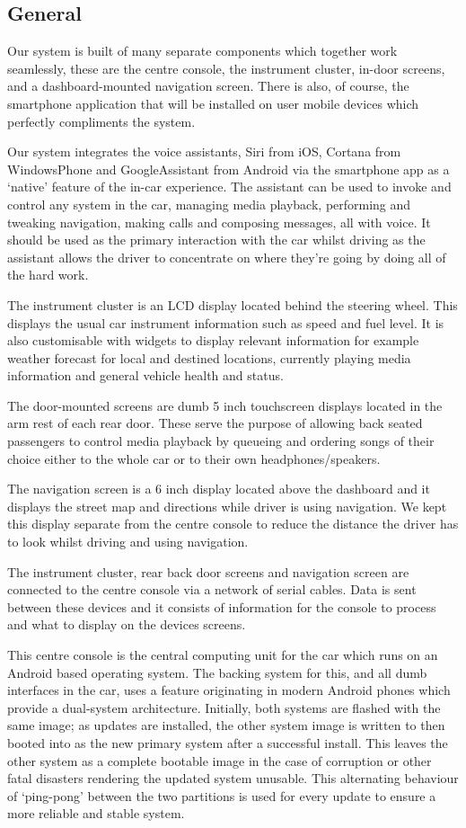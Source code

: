 \documentclass{article}
\begin{document}
\subsection{General}\label{ssec:system-design-general}
Our system is built of many separate components which together work seamlessly, these are the centre console, the instrument cluster, in-door screens, and a dashboard-mounted navigation screen. There is also, of course, the smartphone application that will be installed on user mobile devices which perfectly compliments the system.

Our system integrates the voice assistants, Siri from iOS, Cortana from WindowsPhone and GoogleAssistant from Android via the smartphone app as a `native' feature of the in-car experience. The assistant can be used to invoke and control any system in the car, managing media playback, performing and tweaking navigation, making calls and composing messages, all with voice. It should be used as the primary interaction with the car whilst driving as the assistant allows the driver to concentrate on where they're going by doing all of the hard work.

The instrument cluster is an LCD display located behind the steering wheel. This displays the usual car instrument information such as speed and fuel level. It is also customisable with widgets to display relevant information for example weather forecast for local and destined locations, currently playing media information and general vehicle health and status. 

The door-mounted screens are dumb 5 inch touchscreen displays located in the arm rest of each rear door. These serve the purpose of allowing back seated passengers to control media playback by queueing and ordering songs of their choice either to the whole car or to their own headphones/speakers.

The navigation screen is a 6 inch display located above the dashboard and it displays the street map and directions while driver is using navigation. We kept this display separate from the centre console to reduce the distance the driver has to look whilst driving and using navigation.

The instrument cluster, rear back door screens and navigation screen are connected to the centre console via a network of serial cables. Data is sent between these devices and it consists of information for the console to process and what to display on the devices screens.

This centre console is the central computing unit for the car which runs on an Android based operating system. The backing system for this, and all dumb interfaces in the car, uses a feature originating in modern Android phones which provide a dual-system architecture. Initially, both systems are flashed with the same image; as updates are installed, the other system image is written to then booted into as the new primary system after a successful install. This leaves the other system as a complete bootable image in the case of corruption or other fatal disasters rendering the updated system unusable. This alternating behaviour of `ping-pong' between the two partitions is used for every update to ensure a more reliable and stable system.
\end{document}
